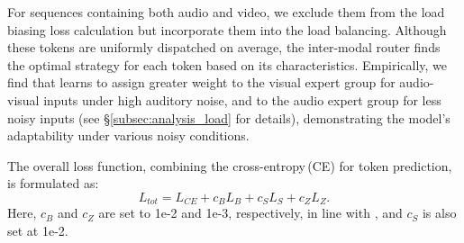 For sequences containing both audio and video, we exclude them from the load biasing loss calculation but incorporate them into the load balancing.
Although these tokens are uniformly dispatched on average, the inter-modal router finds the optimal strategy for each token based on its characteristics.
Empirically, we find that \ourmodel learns to assign greater weight to the visual expert group for audio-visual inputs under high auditory noise, and to the audio expert group for less noisy inputs (see \S\ref{subsec:analysis_load} for details), demonstrating the model’s adaptability under various noisy conditions.

The overall loss function, combining the cross-entropy\,(CE) for token prediction, is formulated as:
\begin{equation}
L_{tot} = L_{CE} + c_B L_B + c_S L_S + c_Z L_Z.
\end{equation}
Here, $c_B$ and $c_Z$ are set to 1e-2 and 1e-3, respectively, in line with \citep{fedus2022switch, zoph2022st}, and $c_S$ is also set at 1e-2.
